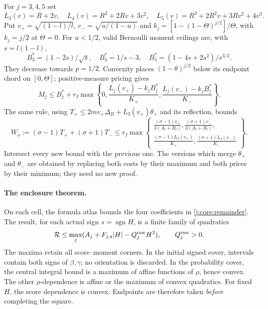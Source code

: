 For $j=3,4,5$ set
\[
 L_3(v)=R+2v,\quad L_4(v)=R^2+2Rv+3v^2,
 \quad L_5(v)=R^3+2R^2v+3Rv^2+4v^3.
\]
Put $v_+=\sqrt{(1-l)/l}$, $v_-=\sqrt{u/(1-u)}$ and
$k_j=[1-(1-\Theta)^{j/2}]/\Theta$, with $k_j=j/2$ at $\Theta=0$.
For $u<1/2$, valid Bernoulli moment ceilings are, with $s=l(1-l)$,
\[
 B_3^*=(1-2s)/\sqrt s,\quad B_4^*=1/s-3,
 \quad B_5^*=(1-4s+2s^2)/s^{3/2}.
\]
They decrease towards $p=1/2$. Convexity places $(1-\theta)^{j/2}$
below its endpoint chord on $[0,\Theta]$; positive-measure pricing gives
\begin{equation}\label{j:local:re:moments}
 M_j\le B_j^*+r_I\max\left\{0,
 \frac{L_j(v_+)-k_jB_j^*}{K_+},
 \frac{L_j(v_-)-k_jB_j^*}{K_-}\right\}.
\end{equation}
The same rule, using
$T_+\le2mv_+\Delta_B+L_3(v_+)\theta_+$ and its reflection, bounds
\begin{equation}\label{j:local:re:outerresource}
 W_o:=(\sigma-1)T_++(\sigma+1)T_-
 \le r_I\max\left\{\begin{gathered}
 \frac{(\sigma-1)v_+}{3(A_l+B_l)},
 \frac{(\sigma+1)v_-}{3(A_l+B_l)},\\
 \frac{(\sigma-1)L_3(v_+)}{K_+},
 \frac{(\sigma+1)L_3(v_-)}{K_-}\end{gathered}\right\}.
\end{equation}
Intersect every new bound with the previous one. The versions which
merge $\theta_+$ and $\theta_-$ are obtained by replacing both costs by
their maximum and both prices by their minimum; they need no new proof.

\paragraph{The enclosure theorem.}\label{j:local:re:operator}
On each cell, the formula atlas bounds the four coefficients in
\eqref{j:core:remainder}. The result, for each actual sign $s=\operatorname{sgn}H$,
is a finite family of quadratics
\begin{equation}\label{j:local:re:quadratics}
 \mathcal R\le\max_j(A_j+F_{j,s}|H|-Q_j^{\rm raw}H^2),
 \qquad Q_j^{\rm raw}>0.
\end{equation}
The maxima retain all score--moment corners. In the initial signed
cover, intervals contain both signs of $\beta,\gamma$; no orientation is
discarded. In the probability cover, the central integral bound is a
maximum of affine functions of $\rho$, hence convex. The other
$\rho$-dependence is affine or the maximum of convex quadratics. For
fixed $H$, the score dependence is convex. Endpoints are therefore taken
\emph{before} completing the square.


